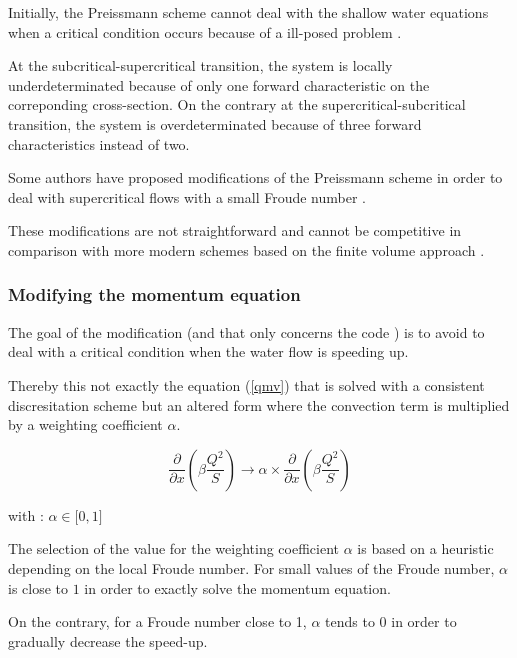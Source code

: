 Initially, the Preissmann scheme cannot deal with the shallow water equations when a critical condition occurs because of a ill-posed problem \cite{MESELHE97}.

At the subcritical-supercritical transition, the system is locally underdeterminated because of only one forward characteristic on the correponding cross-section. On the contrary at the supercritical-subcritical transition,
the system is overdeterminated because of three forward characteristics instead of two.

Some authors have proposed modifications of the Preissmann scheme in order to deal with supercritical flows with a small Froude number \cite{KUTIJA02}\cite{JOHNSON02}.

These modifications are not straightforward and cannot be competitive in comparison with more modern schemes based on the finite volume approach \cite{TORO01}.

\subsubsection{Modifying the momentum equation}

The goal of the modification (and that only concerns the code \REZO{}) is to avoid to deal with a critical condition when the water flow is speeding up.

Thereby this not exactly the equation (\ref{qmv}) that is solved with a consistent discresitation scheme but an altered form where the convection term is multiplied by a weighting coefficient $\alpha$.

\begin{equation}
 \frac{\partial}{\partial x}\left( {\beta \frac{Q^2}{S}} \right) \rightarrow \alpha \times \frac{\partial}{\partial x}\left( {\beta \frac{Q^2}{S}} \right)
\end{equation}

with : $\alpha \in \lbrack 0,1 \rbrack$

The selection of the value for the weighting coefficient $\alpha$ is based on a heuristic depending on the local Froude number. For small values of the Froude number, $\alpha$ is close to $1$ in order to exactly solve the momentum equation.

On the contrary, for a  Froude number close to 1, $\alpha$ tends to $0$ in order to gradually decrease the speed-up.

